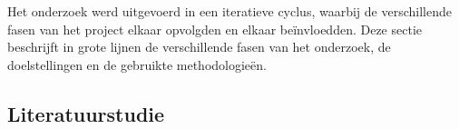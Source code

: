 
\chapter{}%
\label{ch:methodologie}


Het onderzoek werd uitgevoerd in een iteratieve cyclus, waarbij de verschillende fasen van het project elkaar opvolgden en elkaar beïnvloedden.
Deze sectie beschrijft in grote lijnen de verschillende fasen van het onderzoek, de doelstellingen en de gebruikte methodologieën.

\section{Literatuurstudie}

